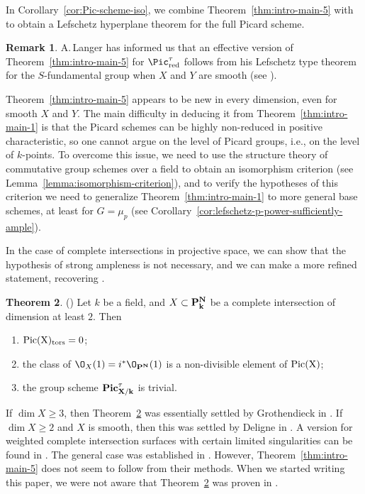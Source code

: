 \documentclass[11pt,reqno]{amsart}
\numberwithin{equation}{section}
\theoremstyle{definition}
\newtheorem{thm}{Theorem}[subsection]
\newtheorem{rmk}[thm]{Remark}
\begin{document}
In Corollary~\ref{cor:Pic-scheme-iso}, we combine Theorem~\ref{thm:intro-main-5} with \cite[Exp.\ XII, Cor.\ 3.6]{SGA2} to obtain a Lefschetz hyperplane theorem for the full Picard scheme. 

\begin{rmk} A.\,Langer has informed us that an effective version of Theorem~\ref{thm:intro-main-5} for $\Pic^\tau_{\rm{red}}$ follows from his Lefschetz type theorem for the $S$-fundamental group when $X$ and $Y$ are smooth (see \cite[Th.~10.2~and~10.4]{Langer}). 
\end{rmk}

Theorem~\ref{thm:intro-main-5} appears to be new in every dimension, even for smooth $X$ and $Y$. The main difficulty in deducing it from Theorem~\ref{thm:intro-main-1} is that the Picard schemes can be highly non-reduced in positive characteristic, so one cannot argue on the level of Picard groups, i.e., on the level of $k$-points. To overcome this issue, we need to use the structure theory of commutative group schemes over a field to obtain an isomorphism criterion (see Lemma~\ref{lemma:isomorphism-criterion}), and to verify the hypotheses of this criterion we need to generalize Theorem~\ref{thm:intro-main-1} to more general base schemes, at least for $G=\mu_p$ (see Corollary~\ref{cor:lefschetz-p-power-sufficiently-ample}). \smallskip

In the case of complete intersections in projective space, we can show that the hypothesis of strong ampleness is not necessary, and we can make a more refined statement, recovering \cite[Corollary 7.2.3]{Ces-Scholze}.

\begin{thm}\label{thm:intro-main-3}(\cite[Cor.~7.2.3]{Ces-Scholze}) Let $k$ be a field, and $X \subset \bf{P}^N_k$ be a complete intersection of dimension at least $2$. Then 
\begin{enumerate}
    \item\label{thm:SGA7-1} $\rm{Pic}(X)_{\rm{tors}}=0$;
    \item\label{thm:SGA7-2} the class of $\O_X(1)=i^*\O_{\bf{P}^N}(1)$ is a non-divisible element of $\rm{Pic}(X)$;
    \item\label{thm:SGA7-3} the group scheme $\bf{Pic}^\tau_{X/k}$ is trivial.
\end{enumerate}
\end{thm}



If $\dim X \geq 3$, then Theorem~\ref{thm:intro-main-3} was essentially settled by Grothendieck in \cite[Exp.\ XII, Cor.\ 3.6]{SGA2}. If $\dim X \geq 2$ and $X$ is smooth, then this was settled by Deligne in \cite[Exp.\ XI, Thm.\ 1.8]{SGA7_2}. A version for weighted complete intersection surfaces with certain limited singularities can be found in \cite[]{Lang-p-torsion}. The general case was established in \cite[Cor.~7.2.3]{Ces-Scholze}. However, Theorem~\ref{thm:intro-main-5} does not seem to follow from their methods. When we started writing this paper, we were not aware that Theorem~\ref{thm:intro-main-3} was proven in \cite{Ces-Scholze}. \smallskip
\end{document}

